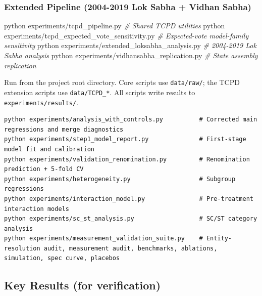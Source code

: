 \documentclass[
]{article}
\newenvironment{Shaded}{}{}
\newcommand{\CommentTok}[1]{\textcolor[rgb]{0.38,0.63,0.69}{\textit{#1}}}
\newcommand{\ExtensionTok}[1]{#1}
\newcommand{\NormalTok}[1]{#1}
\begin{document}
\subsubsection{Extended Pipeline (2004-2019 Lok Sabha + Vidhan Sabha)}\label{extended-pipeline-2004-2019-lok-sabha--vidhan-sabha}

\begin{Shaded}
\begin{Highlighting}[]
\ExtensionTok{python}\NormalTok{ experiments/tcpd\_pipeline.py                   }\CommentTok{\# Shared TCPD utilities}
\ExtensionTok{python}\NormalTok{ experiments/tcpd\_expected\_vote\_sensitivity.py   }\CommentTok{\# Expected{-}vote model{-}family sensitivity}
\ExtensionTok{python}\NormalTok{ experiments/extended\_loksabha\_analysis.py      }\CommentTok{\# 2004{-}2019 Lok Sabha analysis}
\ExtensionTok{python}\NormalTok{ experiments/vidhansabha\_replication.py          }\CommentTok{\# State assembly replication}
\end{Highlighting}
\end{Shaded}

Run from the project root directory. Core scripts use \texttt{data/raw/}; the TCPD extension scripts use \texttt{data/TCPD\_*}. All scripts write results to \texttt{experiments/results/}.

\begin{Verbatim}[breaklines=true,breakanywhere=true,fontsize=\small]
python experiments/analysis_with_controls.py          # Corrected main regressions and merge diagnostics
python experiments/step1_model_report.py              # First-stage model fit and calibration
python experiments/validation_renomination.py         # Renomination prediction + 5-fold CV
python experiments/heterogeneity.py                   # Subgroup regressions
python experiments/interaction_model.py               # Pre-treatment interaction models
python experiments/sc_st_analysis.py                  # SC/ST category analysis
python experiments/measurement_validation_suite.py    # Entity-resolution audit, measurement audit, benchmarks, ablations, simulation, spec curve, placebos
\end{Verbatim}

\subsection{Key Results (for verification)}\label{key-results-for-verification}
\end{document}
